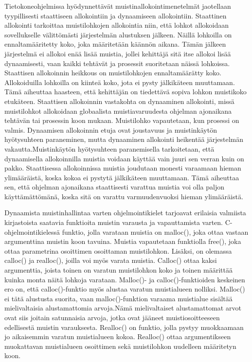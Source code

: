 Tietokoneohjelmissa hyödynnettävät muistinallokointimenetelmät jaotellaan tyypillisesti staattiseen allokointiin ja dynaamiseen allokointiin. Staattinen allokointi tarkoittaa muistilohkojen allokointia niin, että lohkot allokoidaan sovellukselle välittömästi järjestelmän alustuksen jälkeen. Näillä lohkoilla on ennaltamääritetty koko, joka määritetään käännön aikana. Tämän jälkeen järjestelmä ei allokoi enää lisää muistia, jollei kehittäjä sitä itse allokoi lisää dynaamisesti, vaan kaikki tehtävät ja prosessit suoritetaan näissä lohkoissa. Staattisen allokoinnin heikkous on muistilohkojen ennaltamäärätty koko. Allokoiduilla lohkoilla on kiinteä koko, jota ei pysty jälkikäteen muuttamaan. Tämä aiheuttaa haasteen, että kehittäjän on tiedettävä sopiva lohkon muistikoko etukäteen. Staattisen allokoinnin vastakohta on dynaaminen allokointi, missä muistilohkot allokoidaan globaalista muistiavaruudesta ohjelman ajonaikana tehtävän tai prosessin koon mukaan. Muistilohko vapautetaan, kun prosessi on valmis. Dynaamisen allokoinnin etuja ovat joustavuus ja muistinkäytön hyötysuhteen paraneminen, mutta dynaaminen allokointi heikentää järjestelmän vakautta.\cite{daroemmfera@2006}Muistinkäytön hyötysuhteen paranemisella tarkoitetaan, että dynaamisella allokoinnilla muistia voidaan käyttää vain juuri sen verran kuin on pakko. Staattisessa allokoinnissa muistia joudutaan monesti varaamaan hieman ylimääräistä, koska kokoa ei pystytä jälkikäteen muuttamaan. Tämä aiheuttaa sen, että ohjelman ajonaikana staattisesti varattua muistia voi olla paljon käyttämättömänä, koska sitä on varattu varmuudenvuoksi hieman ylimääräistä.

Dynaamista muistinhallintaa varten ohjelmointikielet tarjoavat erilaisia valmiista kirjastoista saatavia funktioita muistin varausta ja vapauttamista varten. C-ohjelmointikielessä funktio, jolla varataan muistia on malloc(), joka ottaa vastaan argumenttina muistin koon tavuina. Muistia vapautetaan funktiolla free(), joka ottaa parametrina osoittimen osoittaman muistilohkon. Lisäksi, on olemassa calloc() ja realloc(), joilla voi myös varata muistia. Calloc() ottaa kaksi argumenttia, joista toinen on varatun muistilohkon koko ja toinen määrittää kuinka monta näitä lohkoja varataan. Malloc()- ja calloc()-funktioiden keskeinen ero on, että calloc()-funktio myös alustaa varatun muistialueen nolliksi. Malloc() ei tätä alustusta suorita, vaan malloc()-funktion varaama muistialue sisältää mielivaltaisia alustamattomia arvoja.\cite{c2015book}Nämä mielivaltaiset alustamattomat arvot ovat siis joitain satunnaisia arvoja, jotka ovat jääneet muistiosoitteeseen edellisestä muistin varauksesta. Realloc() on funktio, jolla pystyy muokkaamaan jo aikaisemmin varatun muistialueen kokoa. Realloc() ottaa argumentikseen muokattavan muistialueen osoittimen sekä muistilohkon uudelleen määritetyn koon\cite{c2015book}.

